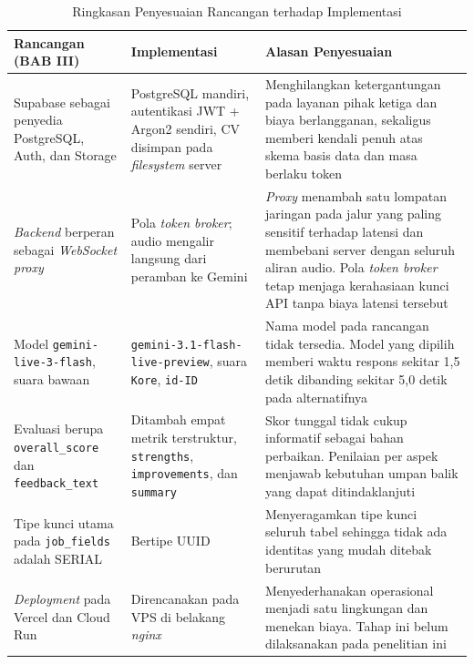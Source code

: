 \documentclass[12pt,a4paper,oneside]{report}
\begin{document}
\begin{table}[H]
\caption{Ringkasan Penyesuaian Rancangan terhadap Implementasi}
\label{tab:deviasi}
\centering
\begin{tabularx}{\textwidth}{|L{3.5cm}|L{3.4cm}|X|}
\hline
\textbf{Rancangan (BAB III)} & \textbf{Implementasi} & \textbf{Alasan Penyesuaian} \\
\hline
Supabase sebagai penyedia PostgreSQL, Auth, dan Storage & PostgreSQL mandiri, autentikasi JWT + Argon2 sendiri, CV disimpan pada \textit{filesystem} server & Menghilangkan ketergantungan pada layanan pihak ketiga dan biaya berlangganan, sekaligus memberi kendali penuh atas skema basis data dan masa berlaku token \\
\hline
\textit{Backend} berperan sebagai \textit{WebSocket proxy} & Pola \textit{token broker}; audio mengalir langsung dari peramban ke Gemini & \textit{Proxy} menambah satu lompatan jaringan pada jalur yang paling sensitif terhadap latensi dan membebani server dengan seluruh aliran audio. Pola \textit{token broker} tetap menjaga kerahasiaan kunci API tanpa biaya latensi tersebut \\
\hline
Model \texttt{gemini-live-}\linebreak\texttt{3-flash}, suara bawaan & \texttt{gemini-3.1-}\linebreak\texttt{flash-live-}\linebreak\texttt{preview}, suara \texttt{Kore}, \texttt{id-ID} & Nama model pada rancangan tidak tersedia. Model yang dipilih memberi waktu respons sekitar 1,5 detik dibanding sekitar 5,0 detik pada alternatifnya \\
\hline
Evaluasi berupa \texttt{overall\_score} dan \texttt{feedback\_text} & Ditambah empat metrik terstruktur, \texttt{strengths}, \texttt{improvements}, dan \texttt{summary} & Skor tunggal tidak cukup informatif sebagai bahan perbaikan. Penilaian per aspek menjawab kebutuhan umpan balik yang dapat ditindaklanjuti \\
\hline
Tipe kunci utama pada \texttt{job\_fields} adalah SERIAL & Bertipe UUID & Menyeragamkan tipe kunci seluruh tabel sehingga tidak ada identitas yang mudah ditebak berurutan \\
\hline
\textit{Deployment} pada Vercel dan Cloud Run & Direncanakan pada VPS di belakang \textit{nginx} & Menyederhanakan operasional menjadi satu lingkungan dan menekan biaya. Tahap ini belum dilaksanakan pada penelitian ini \\
\hline
\end{tabularx}
\end{table}
\end{document}
